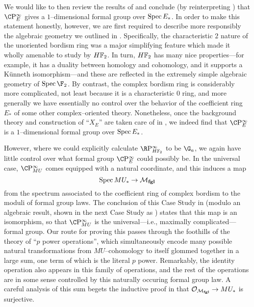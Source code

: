We would like to then review the results of  and conclude (by reinterpreting ) that \(\CP^\infty_E\) gives a \(1\)--dimensional formal group over \(\operatorname{Spec} E_*\).  In order to make this statement honestly, however, we are first required to describe more responsibly the algebraic geometry we outlined in .  Specifically, the characteristic \(2\) nature of the unoriented bordism ring was a major simplifying feature which made it wholly amenable to study by \(\HFtwo\).  In turn, \(\HFtwo\) has many nice properties---for example, it has a duality between homology and cohomology, and it supports a K\"unneth isomorphism---and these are reflected in the extremely simple algebraic geometry of \(\Spec \F_2\).  By contrast, the complex bordism ring is considerably more complicated, not least because it is a characteristic \(0\) ring, and more generally we have essentially no control over the behavior of the coefficient ring \(E_*\) of some other complex--oriented theory.  Nonetheless, once the background theory and construction of ``\(X_E\)'' are taken care of in , we indeed find that \(\CP^\infty_E\) is a \(1\)--dimensional formal group over \(\operatorname{Spec} E_*\).

However, where we could explicitly calculate \(\RP^\infty_{\HFtwo}\) to be \(\G_a\), we again have little control over what formal group \(\CP^\infty_E\) could possibly be.  In the universal case, \(\CP^\infty_{MU}\) comes equipped with a natural coordinate, and this induces a map \[\operatorname{Spec} MU_* \to \mathcal{M}_{\mathbf{fgl}}\] from the spectrum associated to the coefficient ring of complex bordism to the moduli of formal group laws.  The conclusion of this Case Study in  (modulo an algebraic result, shown in the next Case Study as ) states that this map is an isomorphism, so that \(\CP^\infty_{MU}\) is the universal---i.e., maximally complicated---formal group.  Our route for proving this passes through the foothills of the theory of ``\(p\){\th} power operations'', which simultaneously encode many possible natural transformations from \(MU\)--cohomology to itself glommed together in a large sum, one term of which is the literal \(p\){\th} power.  Remarkably, the identity operation also appears in this family of operations, and the rest of the operations are in some sense controlled by this naturally occuring formal group law.  A careful analysis of this sum begets the inductive proof in  that \(\mathcal{O}_{\mathcal{M}_{\mathbf{fgl}}} \to MU_*\) is surjective.

